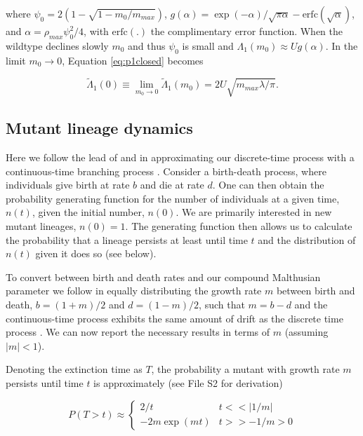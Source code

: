 \documentclass[9pt,twocolumn,twoside,lineno]{gsajnl}
\begin{document}
\noindent where $\psi_0 = 2(1-\sqrt{1-m_0/m_{max}})$, $g(\alpha) = \exp(-\alpha)/\sqrt{\pi \alpha} - \mathrm{erfc}(\sqrt{\alpha})$, and $\alpha=\rho_{max} \psi_0^2/4$, with $\mathrm{erfc}(.)$ the complimentary error function.
When the wildtype declines slowly $m_0$ and thus $\psi_0$ is small and $\Lambda_1(m_0)\approx U g(\alpha)$.
In the limit $m_0\rightarrow0$, Equation \ref{eq:p1closed} becomes

\begin{equation}\label{eq:Lambda0}
\tilde{\Lambda}_1(0) \equiv \lim_{m_0\rightarrow0} \tilde{\Lambda}_1(m_0) = 2 U \sqrt{m_{max}\lambda/\pi}.
\end{equation} 

\subsection{Mutant lineage dynamics}
\label{subsec:mutants}

Here we follow the lead of \cite{Weissman2010} and \cite{Uecker2016} in approximating our discrete-time process with a continuous-time branching process \citep[see chapter 6 in][]{Allen2010}. 
Consider a birth-death process, where individuals give birth at rate $b$ and die at rate $d$. 
One can then obtain the probability generating function for the number of individuals at a given time, $n(t)$, given the initial number, $n(0)$.
We are primarily interested in new mutant lineages, $n(0)=1$.
The generating function then allows us to calculate the probability that a lineage persists at least until time $t$ and the distribution of $n(t)$ given it does so (see below).

To convert between birth and death rates and our compound Malthusian parameter we follow \cite{Uecker2016} in equally distributing the growth rate $m$ between birth and death, $b = (1+m)/2$ and $d=(1-m)/2$, such that $m=b-d$ and the continuous-time process exhibits the same amount of drift as the discrete time process \citep[and matches discrete-time simulations well;][]{Uecker2014}.
We can now report the necessary results in terms of $m$ (assuming $|m|<1$).

Denoting the extinction time as $T$, the probability a mutant with growth rate $m$ persists until time $t$ is approximately (see File S2 for derivation)

\begin{equation}\label{eq:pT}
P( T > t ) \approx 
\begin{cases}
	2 / t & t << |1/m| \\
	-2 m \exp(m t) & t >> -1/m > 0
\end{cases}
\end{equation}
\end{document}
